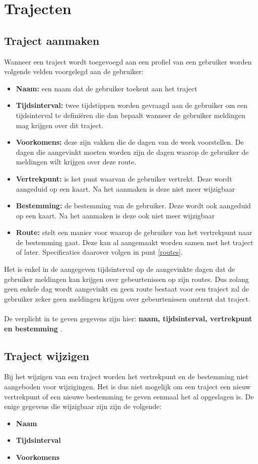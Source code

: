 \documentclass{scrbook}
\newcommand*{\veld}[1]{
	\item \textbf{#1} 
}
\newcommand*{\verplicht}[1]{
	\textbf{#1}
}
\begin{document}
\section{Trajecten}
\subsection{Traject aanmaken}\label{trav_new}
Wanneer een traject wordt toegevoegd aan een profiel van een gebruiker worden volgende velden voorgelegd aan de gebruiker:
\begin{itemize}
\veld{Naam:} een naam dat de gebruiker toekent aan het traject
\veld{Tijdsinterval:} twee tijdstippen worden gevraagd aan de gebruiker om een tijdsinterval te defini\"eren die dan bepaalt wanneer de gebruiker meldingen mag krijgen over dit traject.
\veld{Voorkomens:} deze zijn vakken die de dagen van de week voorstellen. De dagen die aangevinkt moeten worden zijn de dagen waarop de gebruiker de meldingen wilt krijgen over deze route.
\veld{Vertrekpunt:} is het punt waarvan de gebruiker vertrekt. Deze wordt aangeduid op een kaart.  Na het aanmaken is deze niet meer wijzigbaar
\veld{Bestemming:} de bestemming van de gebruiker. Deze wordt ook aangeduid op een kaart. Na het aanmaken is deze ook niet meer wijzigbaar
\veld{Route:} stelt een manier voor waarop de gebruiker van het vertrekpunt naar de bestemming gaat. Deze kan al aangemaakt worden samen met het traject of later. Specificaties daarover volgen in punt \ref{routes}.
\end{itemize}
 Het is enkel in de aangegeven tijdsinterval op de aangevinkte dagen dat de gebruiker meldingen kan krijgen over gebeurtenissen op zijn routes. Dus zolang geen enkele dag wordt aangevinkt en geen route bestaat voor een traject zal de gebruiker zeker geen meldingen krijgen over gebeurtenissen omtrent dat traject.
\paragraph{}De verplicht in te geven gegevens zijn hier:\verplicht{naam, tijdsinterval, vertrekpunt en bestemming}.


\subsection{Traject wijzigen}
Bij het wijzigen van een traject worden het vertrekpunt en de bestemming niet aangeboden voor wijzigingen. Het is dus niet mogelijk om een traject een nieuw vertrekpunt of een nieuwe bestemming te geven eenmaal het al opgeslagen is. De enige gegevens die wijzigbaar zijn zijn de volgende:
\begin{itemize}
\veld{Naam}
\veld{Tijdsinterval}
\veld{Voorkomens}
\end{itemize}
\end{document}

